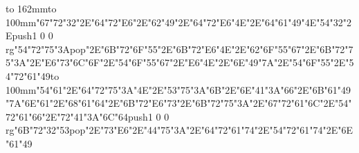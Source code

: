 \hbox to 162mm{\hsize=69mm\vbox to 100mm{\vfill\ipa\char"67\ipa\char"72\ipa\char"32\ipa\char"2E\ipa\char"64\ipa\char"72\ipa\char"E6\ipa\char"2E\ipa\char"62\ipa\char"49\ipa\char"2E\ipa\char"64\ipa\char"72\ipa\char"E6\ipa\char"4E\ipa\char"2E\ipa\char"64\ipa\char"61\ipa\char"49\ipa\char"4E\medskip\ipa\char"54\ipa\char"32\ipa\char"2E\pdfcolorstack\match push{1 0 0 rg}\ipa\char"54\ipa\char"72\ipa\char"75\ipa\char"3A\pdfcolorstack\match pop{}\ipa\char"2E\ipa\char"6B\ipa\char"72\ipa\char"6F\ipa\char"55\ipa\char"2E\ipa\char"6B\ipa\char"72\ipa\char"E6\ipa\char"4E\ipa\char"2E\ipa\char"62\ipa\char"6F\ipa\char"55\ipa\char"67\ipa\char"2E\ipa\char"6B\ipa\char"72\ipa\char"75\ipa\char"3A\ipa\char"2E\ipa\char"E6\ipa\char"73\medskip\ipa\char"6C\ipa\char"6F\ipa\char"2E\ipa\char"54\ipa\char"6F\ipa\char"55\ipa\char"67\ipa\char"2E\ipa\char"E6\ipa\char"4E\ipa\char"2E\ipa\char"6E\ipa\char"49\ipa\char"7A\ipa\char"2E\ipa\char"54\ipa\char"6F\ipa\char"55\ipa\char"2E\ipa\char"54\ipa\char"72\ipa\char"61\ipa\char"49\vfill}\hfill\vbox to 100mm{\vfill\ipa\char"54\ipa\char"61\ipa\char"2E\ipa\char"64\ipa\char"72\ipa\char"75\ipa\char"3A\ipa\char"4E\ipa\char"2E\ipa\char"53\ipa\char"75\ipa\char"3A\ipa\char"6B\ipa\char"2E\ipa\char"6E\ipa\char"41\ipa\char"3A\ipa\char"66\ipa\char"2E\ipa\char"6B\ipa\char"61\ipa\char"49\ipa\char"7A\medskip\ipa\char"6E\ipa\char"61\ipa\char"2E\ipa\char"68\ipa\char"61\ipa\char"64\ipa\char"2E\ipa\char"6B\ipa\char"72\ipa\char"E6\ipa\char"73\ipa\char"2E\ipa\char"6B\ipa\char"72\ipa\char"75\ipa\char"3A\ipa\char"2E\ipa\char"67\ipa\char"72\ipa\char"61\ipa\char"6C\ipa\char"2E\ipa\char"54\ipa\char"72\ipa\char"61\ipa\char"66\ipa\char"2E\ipa\char"72\ipa\char"41\ipa\char"3A\ipa\char"6C\ipa\char"64\medskip\pdfcolorstack\match push{1 0 0 rg}\ipa\char"6B\ipa\char"72\ipa\char"32\ipa\char"53\pdfcolorstack\match pop{}\ipa\char"2E\ipa\char"73\ipa\char"E6\ipa\char"2E\ipa\char"44\ipa\char"75\ipa\char"3A\ipa\char"2E\ipa\char"64\ipa\char"72\ipa\char"61\ipa\char"74\ipa\char"2E\ipa\char"54\ipa\char"72\ipa\char"61\ipa\char"74\ipa\char"2E\ipa\char"6E\ipa\char"61\ipa\char"49\vfill}}\eject
